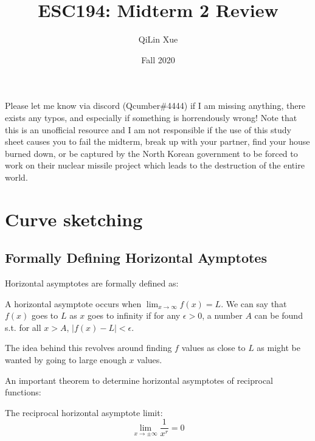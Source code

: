 \documentclass{article}
\title{ESC194: Midterm 2 Review}
\author{QiLin Xue}
\date{Fall 2020}
\begin{document}
\maketitle
Please let me know via discord (Qcumber\#4444) if I am missing anything, there exists any typos, and especially if something is horrendously wrong! Note that this is an unofficial resource and I am not responsible if the use of this study sheet causes you to fail the midterm, break up with your partner, find your house burned down, or be captured by the North Korean government to be forced to work on their nuclear missile project which leads to the destruction of the entire world.
\tableofcontents
\printindex

\newpage
\section{Curve sketching}
\subsection{Formally Defining Horizontal Aymptotes}
Horizontal asymptotes are formally defined as:
\begin{definition}
    A horizontal asymptote occurs when $\lim_{x\to\infty}f(x)=L$. We can say that 
    $f(x)$ goes to $L$ as $x$ goes to infinity if for any $\epsilon>0$, a number $A$ can be found s.t. for all $x>A$, $|f(x)-L|<\epsilon$.
    \vspace{2mm}

    The idea behind this revolves around finding $f$ values as close to $L$ as might be wanted by going to large enough $x$ values.
\end{definition}
An important theorem to determine horizontal asymptotes of reciprocal functions:
\begin{theorem}
    The reciprocal horizontal asymptote limit:
    \begin{equation}
        \lim_{x\to \pm \infty} \frac{1}{x^r} = 0
        \label{eq:}
    \end{equation}
\end{theorem}
\end{document}
